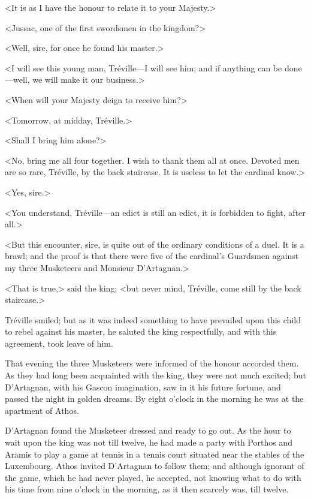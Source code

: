 <It is as I have the honour to relate it to your Majesty.> 

<Jussac, one of the first swordsmen in the kingdom?> 

<Well, sire, for once he found his master.> 

<I will see this young man, Tréville—I will see him; and if anything can be done—well, we will make it our business.> 

<When will your Majesty deign to receive him?> 

<Tomorrow, at midday, Tréville.> 

<Shall I bring him alone?> 

<No, bring me all four together. I wish to thank them all at once. Devoted men are so rare, Tréville, by the back staircase. It is useless to let the cardinal know.> 

<Yes, sire.> 

<You understand, Tréville—an edict is still an edict, it is forbidden to fight, after all.> 

<But this encounter, sire, is quite out of the ordinary conditions of a duel. It is a brawl; and the proof is that there were five of the cardinal's Guardsmen against my three Musketeers and Monsieur D'Artagnan.> 

<That is true,> said the king; <but never mind, Tréville, come still by the back staircase.> 

Tréville smiled; but as it was indeed something to have prevailed upon this child to rebel against his master, he saluted the king respectfully, and with this agreement, took leave of him. 

That evening the three Musketeers were informed of the honour accorded them. As they had long been acquainted with the king, they were not much excited; but D'Artagnan, with his Gascon imagination, saw in it his future fortune, and passed the night in golden dreams. By eight o'clock in the morning he was at the apartment of Athos. 

D'Artagnan found the Musketeer dressed and ready to go out. As the hour to wait upon the king was not till twelve, he had made a party with Porthos and Aramis to play a game at tennis in a tennis court situated near the stables of the Luxembourg. Athos invited D'Artagnan to follow them; and although ignorant of the game, which he had never played, he accepted, not knowing what to do with his time from nine o'clock in the morning, as it then scarcely was, till twelve. 

